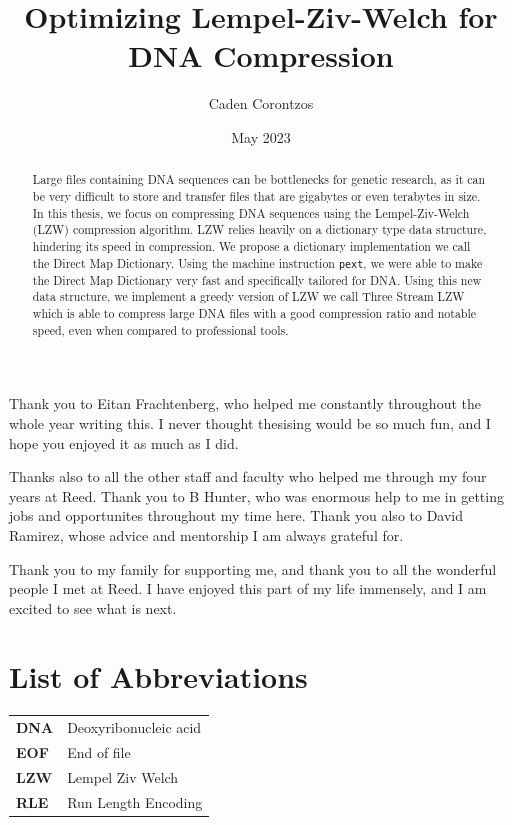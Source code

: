 \documentclass[12pt,twoside]{reedthesis}
\title{Optimizing Lempel-Ziv-Welch for DNA Compression}
\author{Caden Corontzos}
\date{May 2023}
\begin{document}
  \maketitle

\frontmatter %
\pagestyle{empty} %
  \begin{acknowledgements}
    Thank you to Eitan Frachtenberg, who helped me constantly throughout the whole year writing this. I never thought thesising would be so much fun, and I hope you enjoyed it as much as I did.

    Thanks also to all the other staff and faculty who helped me through my four years at Reed. Thank you to B Hunter, who was enormous help to me in getting jobs and opportunites throughout my time here. Thank you also to David Ramirez, whose advice and mentorship I am always grateful for.

    Thank you to my family for supporting me, and thank you to all the wonderful people I met at Reed. I have enjoyed this part of my life immensely, and I am excited to see what is next.
  \end{acknowledgements}

\chapter*{List of Abbreviations}
\begin{table}[h]
    \centering
    \begin{tabular}{ll}
                \textbf{DNA} & Deoxyribonucleic acid \\
                \textbf{EOF} & End of file \\
                \textbf{LZW} & Lempel Ziv Welch \\
                \textbf{RLE} & Run Length Encoding \\
            \end{tabular}
\end{table}
  \hypersetup{linkcolor=black}
  \setcounter{secnumdepth}{2}
  \setcounter{tocdepth}{2}
  \tableofcontents

  \listoftables

  \listoffigures
  \begin{abstract}
    Large files containing DNA sequences can be bottlenecks for genetic research, as it can be very difficult to store and transfer files that are gigabytes or even terabytes in size. In this thesis, we focus on compressing DNA sequences using the Lempel-Ziv-Welch (LZW) compression algorithm. LZW relies heavily on a dictionary type data structure, hindering its speed in compression. We propose a dictionary implementation we call the Direct Map Dictionary. Using the machine instruction \texttt{pext}, we were able to make the Direct Map Dictionary very fast and specifically tailored for DNA. Using this new data structure, we implement a greedy version of LZW we call Three Stream LZW which is able to compress large DNA files with a good compression ratio and notable speed, even when compared to professional tools.
  \end{abstract}
\end{document}

